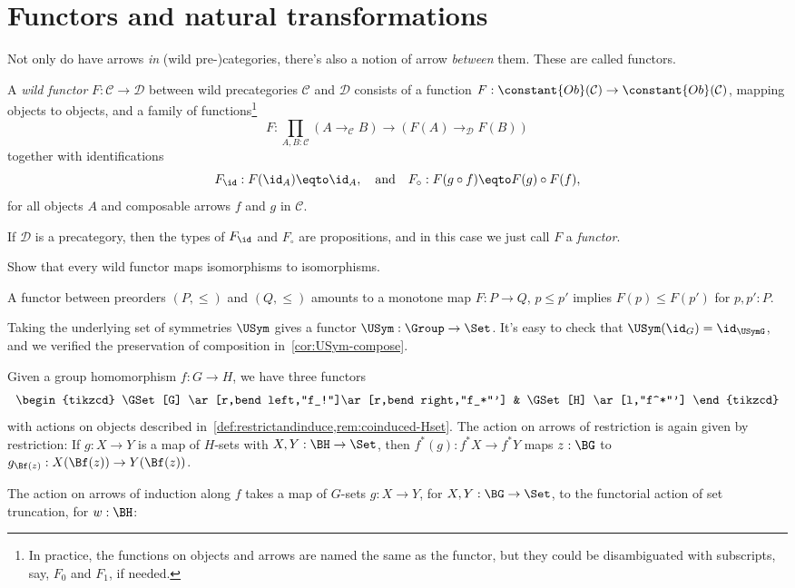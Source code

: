 \section{Functors and natural transformations}
\label{sec:naturality}

Not only do have arrows \emph{in} (wild pre-)categories, there's also
a notion of arrow \emph{between} them. These are called functors.
\begin{definition}\label{def:functor}
  A \emph{wild functor}
  $F : \mathcal C \to \mathcal D$
  between wild precategories $\mathcal C$ and $\mathcal D$
  consists of a function
  $F : \constant{Ob}(\mathcal C) \to \constant{Ob}(\mathcal C)$,
  mapping objects to objects,
  and a family of functions\footnote{%
    In practice, the functions on objects and arrows are named the same as
    the functor, but they could be disambiguated with subscripts,
    say, $F_0$ and $F_1$, if needed.}
  \[
    F : \prod_{A,B:\mathcal C}(A \to_{\mathcal C} B) \to (F(A) \to_{\mathcal D} F(B))
  \]
  together with identifications
  \[
    F_{\id} : F(\id_A) \eqto \id_A,\quad\text{and}\quad
    F_{\circ} : F(g\circ f) \eqto F(g)\circ F(f),
  \]
  for all objects $A$ and composable arrows $f$ and $g$ in $\mathcal C$.

  If $\mathcal D$ is a precategory, then the types of $F_{\id}$ and $F_{\circ}$
  are propositions, and in this case we just call $F$ a \emph{functor}.
\end{definition}
\begin{xca}
  Show that every wild functor maps isomorphisms to isomorphisms.
\end{xca}
\begin{example}
  A functor between preorders $(P,\le)$ and $(Q,\le)$ amounts to a monotone map
  $F : P\to Q$, \ie $p\le p'$ implies $F(p) \le F(p')$ for $p,p':P$.
\end{example}
\begin{example}
  Taking the underlying set of symmetries $\USym$
  gives a functor $\USym : \Group \to \Set$.
  It's easy to check that $\USym(\id_G) = \id_{\USymG}$,
  and we verified the preservation of composition
  in~\cref{cor:USym-compose}.
\end{example}
\begin{example}
  Given a group homomorphism $f : G \to H$,
  we have three functors
  \[
    \begin{tikzcd}
      \GSet[G] \ar[r,bend left,"f_!"]\ar[r,bend right,"f_*"'] &
      \GSet[H] \ar[l,"f^*"']
    \end{tikzcd}
  \]
  with actions on objects described in~\cref{def:restrictandinduce,rem:coinduced-Hset}.
  The action on arrows of restriction is again given by restriction:
  If $g : X \to Y$ is a map of $H$-sets with $X,Y:\BH \to \Set$,
  then $f^*(g) : f^*X \to f^*Y$ maps $z:\BG$ to $g_{\Bf(z)} : X(\Bf(z)) \to Y(\Bf(z))$.

  The action on arrows of induction along $f$ takes a map of $G$-sets $g : X \to Y$,
  for $X,Y : \BG\to\Set$,
  to the functorial action of set truncation, for $w:\BH$:
\end{example}
